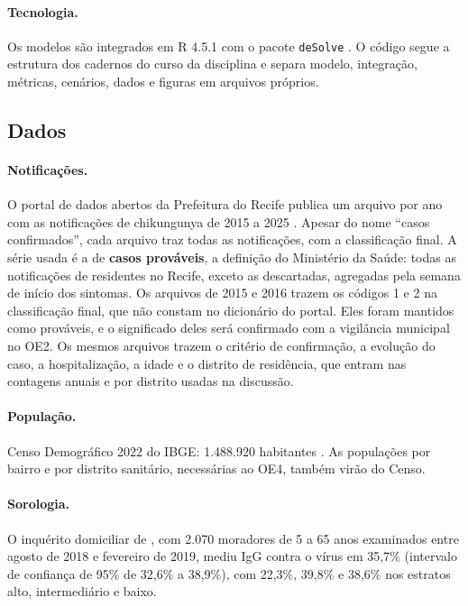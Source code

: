 \paragraph{Tecnologia.} Os modelos são integrados em R 4.5.1 \cite{rcore2025} com o pacote
\texttt{deSolve} \cite{soetaert2010}. O código segue a estrutura dos cadernos do curso da disciplina e
separa modelo, integração, métricas, cenários, dados e figuras em arquivos próprios.

\subsection{Dados}

\paragraph{Notificações.} O portal de dados abertos da Prefeitura do Recife publica um arquivo por ano com
as notificações de chikungunya de 2015 a 2025 \cite{recife2026}. Apesar do nome ``casos confirmados'',
cada arquivo traz todas as notificações, com a classificação final. A série usada é a de \textbf{casos
prováveis}, a definição do Ministério da Saúde: todas as notificações de residentes no Recife, exceto as
descartadas, agregadas pela semana de início dos sintomas. Os arquivos de 2015 e 2016 trazem os códigos 1 e
2 na classificação final, que não constam no dicionário do portal. Eles foram mantidos como prováveis, e o
significado deles será confirmado com a vigilância municipal no OE2. Os mesmos arquivos trazem o critério
de confirmação, a evolução do caso, a hospitalização, a idade e o distrito de residência, que entram nas
contagens anuais e por distrito usadas na discussão.

\paragraph{População.} Censo Demográfico 2022 do IBGE: 1.488.920 habitantes \cite{ibge2022}. As populações
por bairro e por distrito sanitário, necessárias ao OE4, também virão do Censo.

\paragraph{Sorologia.} O inquérito domiciliar de , com 2.070 moradores de 5 a 65 anos
examinados entre agosto de 2018 e fevereiro de 2019, mediu IgG contra o vírus em 35,7\% (intervalo de
confiança de 95\% de 32,6\% a 38,9\%), com 22,3\%, 39,8\% e 38,6\% nos estratos alto, intermediário e baixo.

